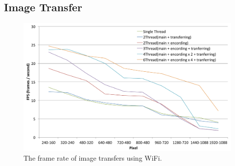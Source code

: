 \subsection{Image Transfer}

\begin{figure}[!t]
 \centering
 \includegraphics[width=0.8\hsize]{fig/No8_TIPiC_FPS_graph_WiFi.pdf}
 \caption{The frame rate of image transfers using WiFi.}
 \label{fig:no8}
\end{figure}

